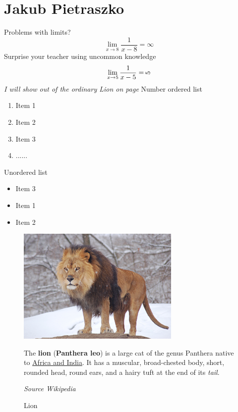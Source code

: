 \hline

\section{Jakub Pietraszko}


\newline


Problems with limits?
\[\lim_{x\to 8} \frac{1}{x-8} = \infty\]
Surprise your teacher using uncommon knowledge
\[ \lim_{x\to 5} \frac{1}{x-5} = \rotatebox{90}{5}\]
\emph{I will show out of the ordinary Lion on page \pageref{fig:Lion}}
\newline
\newline
Number ordered list
\begin{enumerate}
    \item Item 1
    \item Item 2
    \item Item 3
    \item ......
\end{enumerate}





Unordered list
\begin{itemize}
    \item Item 3
    \item Item 1
    \item Item 2
\end{itemize}



\begin{figure}[h]
\centering

\includegraphics[width=0.7\textwidth]{pictures/Lew.jpg}

\caption{\label{fig:Lion}Lion}

\begin{flushleft}
The \textbf{lion} (\textbf{Panthera leo}) is a large cat of the genus Panthera native to \underline{Africa and India}. It has a muscular, broad-chested body, short, rounded head, round ears, and a hairy tuft at the end of its \emph{tail}.
\end{flushleft}

\newline

\begin{flushright}
\textit{Source Wikipedia}
\end{flushright}

\end{figure}




\newpage